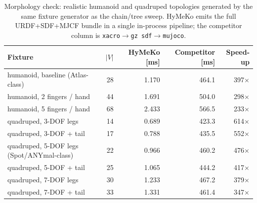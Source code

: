 \begin{table}[t]
\centering
\caption{Morphology check: realistic humanoid and quadruped topologies generated by the same fixture generator as the chain/tree sweep. HyMeKo emits the full URDF+SDF+MJCF bundle in a single in-process pipeline; the competitor column is \texttt{xacro}$\to$\texttt{gz~sdf}$\to$\texttt{mujoco}.}
\label{tab:morphology}
\begin{tabular}{lrrrr}
\toprule
Fixture & $|V|$ & HyMeKo [ms] & Competitor [ms] & Speed-up \\
\midrule
humanoid, baseline (Atlas-class) & 28 & 1.170 & 464.1 & 397$\times$ \\
humanoid, 2 fingers / hand & 44 & 1.691 & 504.0 & 298$\times$ \\
humanoid, 5 fingers / hand & 68 & 2.433 & 566.5 & 233$\times$ \\
quadruped, 3-DOF legs & 14 & 0.689 & 423.3 & 614$\times$ \\
quadruped, 3-DOF + tail & 17 & 0.788 & 435.5 & 552$\times$ \\
quadruped, 5-DOF legs (Spot/ANYmal-class) & 22 & 0.966 & 460.2 & 476$\times$ \\
quadruped, 5-DOF + tail & 25 & 1.065 & 444.2 & 417$\times$ \\
quadruped, 7-DOF legs & 30 & 1.233 & 467.2 & 379$\times$ \\
quadruped, 7-DOF + tail & 33 & 1.331 & 461.4 & 347$\times$ \\
\bottomrule
\end{tabular}
\end{table}